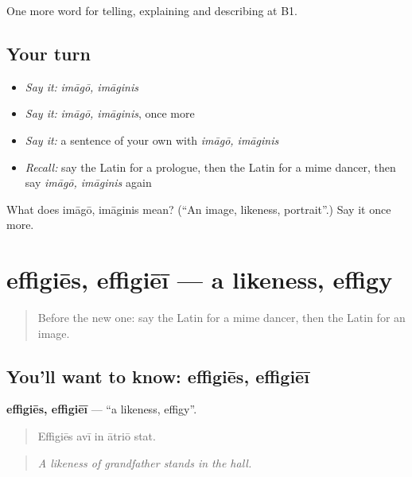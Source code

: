 \begin{grammarlens}[title={What you've built}]
One more word for telling, explaining and describing at B1.
\end{grammarlens}

\subsection*{Your turn}
\begin{itemize}
\raggedright
  \item \emph{Say it:} \emph{imāgō, imāginis}
  \item \emph{Say it:} \emph{imāgō, imāginis}, once more
  \item \emph{Say it:} a sentence of your own with \emph{imāgō, imāginis}
  \item \emph{Recall:} say the Latin for a prologue, then the Latin for a mime dancer, then say \emph{imāgō, imāginis} again
\end{itemize}

\begin{tcolorbox}[breakable,colback=teal!4,colframe=teal!35!black,title={Before you move on}]
What does imāgō, imāginis mean? (\textquotedblleft{}An image, likeness, portrait\textquotedblright{}.) Say it once more.
\end{tcolorbox}
\section[effigiēs, effigiēī]{effigiēs, effigiēī — a likeness, effigy}

\label{lesson:LA-C547-effigies}



\begin{quote}
Before the new one: say the Latin for a mime dancer, then the Latin for an image.
\end{quote}

\subsection*{You'll want to know: effigiēs, effigiēī}
\textbf{effigiēs, effigiēī} — \textquotedblleft{}a likeness, effigy\textquotedblright{}.

\begin{quote}
Effigiēs avī in ātriō stat.
\end{quote}

\begin{quote}
\emph{A likeness of grandfather stands in the hall.}
\end{quote}

